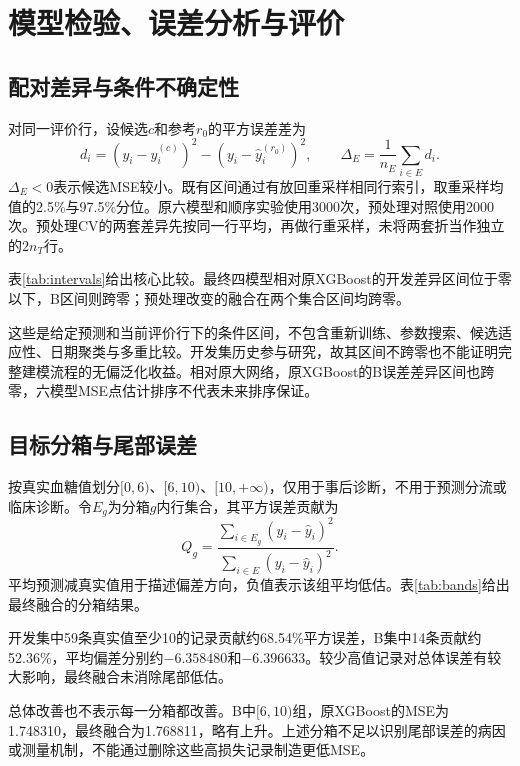 \section{模型检验、误差分析与评价}\label{sec:evaluation}

\subsection{配对差异与条件不确定性}
对同一评价行，设候选$c$和参考$r_0$的平方误差差为
\begin{equation}
d_i=(y_i-\hat y_i^{(c)})^2-(y_i-\hat y_i^{(r_0)})^2,
\qquad\Delta_E=\frac1{n_E}\sum_{i\in E}d_i.
\label{eq:paired}
\end{equation}
$\Delta_E<0$表示候选MSE较小。既有区间通过有放回重采样相同行索引，取重采样均值的2.5\%与97.5\%分位。原六模型和顺序实验使用3000次，预处理对照使用2000次。预处理CV的两套差异先按同一行平均，再做行重采样，未将两套折当作独立的$2n_T$行。

表\ref{tab:intervals}给出核心比较。最终四模型相对原XGBoost的开发差异区间位于零以下，B区间则跨零；预处理改变的融合在两个集合区间均跨零。


这些是给定预测和当前评价行下的条件区间，不包含重新训练、参数搜索、候选适应性、日期聚类与多重比较。开发集历史参与研究，故其区间不跨零也不能证明完整建模流程的无偏泛化收益。相对原大网络，原XGBoost的B误差差异区间也跨零，六模型MSE点估计排序不代表未来排序保证。

\subsection{目标分箱与尾部误差}
按真实血糖值划分$[0,6)$、$[6,10)$、$[10,+\infty)$，仅用于事后诊断，不用于预测分流或临床诊断。令$E_g$为分箱$g$内行集合，其平方误差贡献为
\begin{equation}
Q_g=\frac{\sum_{i\in E_g}(y_i-\hat y_i)^2}{\sum_{i\in E}(y_i-\hat y_i)^2}.
\label{eq:sse-share}
\end{equation}
平均预测减真实值用于描述偏差方向，负值表示该组平均低估。表\ref{tab:bands}给出最终融合的分箱结果。


开发集中59条真实值至少10的记录贡献约68.54\%平方误差，B集中14条贡献约52.36\%，平均偏差分别约$-6.358480$和$-6.396633$。较少高值记录对总体误差有较大影响，最终融合未消除尾部低估。

总体改善也不表示每一分箱都改善。B中$[6,10)$组，原XGBoost的MSE为1.748310，最终融合为1.768811，略有上升。上述分箱不足以识别尾部误差的病因或测量机制，不能通过删除这些高损失记录制造更低MSE。

